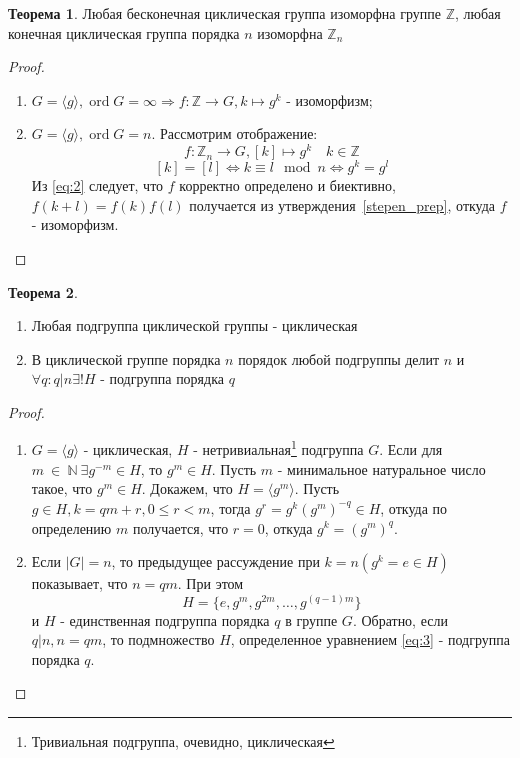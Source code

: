 \documentclass[11pt,a4paper]{report}
\def\Integer{\mathbb{Z}}
\def\Natural{\mathbb{N}}
\DeclareMathOperator{\ord}{ord}
\renewcommand{\leq}{\leqslant}
\renewcommand{\implies}{\Rightarrow}
\newcommand{\is}{\Leftrightarrow}
\theoremstyle{definition}
\theoremstyle{definition}
\newtheorem{theorem}{Теорема}[section]
\theoremstyle{definition}
\begin{document}
	\begin{theorem}\label{cyclic_group_theorem}
	Любая бесконечная циклическая группа изоморфна группе $\Integer$, любая конечная циклическая группа порядка $n$ изоморфна $\Integer_n$
	\begin{proof}
	\begin{enumerate}
	\item{$G=\langle g\rangle, \ord{G} = \infty\implies f:\Integer\rightarrow G, k\mapsto g^k$ - изоморфизм;}
	\item{$G=\langle g \rangle, \ord{G} = n.$ Рассмотрим отображение:
	\begin{equation}
	f:\Integer_n\rightarrow G, [k]\mapsto g^k\quad k\in \Integer
	\end{equation}}
	\begin{equation}\label{eq:2}
	[k] = [l]\is k\equiv l \mod{n}\is g^k=g^l
	\end{equation}
	Из \ref{eq:2} следует, что $f$ корректно определено и биективно, $f(k+l)=f(k)f(l)$ получается из утверждения~\ref{stepen_prep}, откуда $f$ - изоморфизм.
	\end{enumerate}
	\end{proof}
	\end{theorem}
	
	
	
	\begin{theorem}\label{subgroup_cyclic_theorem}
	\begin{enumerate}
	\item{Любая подгруппа циклической группы - циклическая}
	\item{В циклической группе порядка $n$ порядок любой подгруппы делит $n$ и $\forall q: q | n \exists ! H$ - подгруппа порядка $q$}
	\end{enumerate}
	\begin{proof}
	\begin{enumerate}
	\item{
	$G=\langle g\rangle$ - циклическая, $H$ - нетривиальная\footnote{Тривиальная подгруппа, очевидно, циклическая} подгруппа $G$. Если для $m~\in~\Natural~\exists g^{-m}\in H$, то $g^m\in H$. Пусть $m$ - минимальное натуральное число такое, что $g^m\in H$. Докажем, что $H = \langle g^m\rangle$. Пусть $g\in H, k = qm+r, 0\leq r<m$, тогда $g^r=g^k(g^m)^{-q}\in H$, откуда по определению $m$ получается, что $r=0$, откуда $g^k=(g^m)^q$.}
	\item{
	Если $|G|=n$, то предыдущее рассуждение при $k = n (g^k=e\in H)$ показывает, что $n=qm$. При этом \begin{equation}\label{eq:3}H = \{e, g^m, g^{2m}, \ldots, g^{(q-1)m}\}\end{equation} и $H$ - единственная подгруппа порядка $q$ в группе $G$. Обратно, если $q |n, n = qm$, то подмножество $H$, определенное уравнением \eqref{eq:3} - подгруппа порядка $q$.}
	\end{enumerate}
	\end{proof}
	\end{theorem}
	
\end{document}
